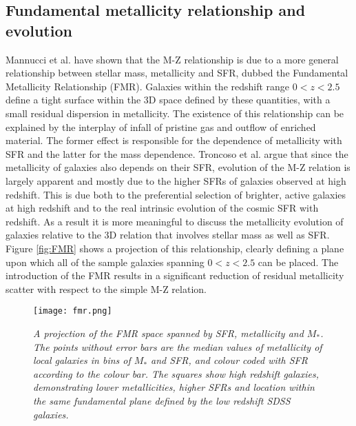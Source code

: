 \documentclass{literature}
\begin{document}
\subsection{Fundamental metallicity relationship and evolution}\label{subsec:fmr}
Mannucci et al. \citep{Mannucci2010} have shown that the M-Z relationship is due to a more general relationship between stellar mass, metallicity and SFR, dubbed the Fundamental Metallicity Relationship (FMR). Galaxies within the redshift range $0 < z < 2.5$ define a tight surface within the 3D space defined by these quantities, with a small residual dispersion in metallicity. The existence of this relationship can be explained by the interplay of infall of pristine gas and outflow of enriched material. The former effect is responsible for the dependence of metallicity with SFR and the latter for the mass dependence. Troncoso et al. \citep{Troncoso_2014} argue that since the metallicity of galaxies also depends on their SFR, evolution of the M-Z relation is largely apparent and mostly due to the higher SFRs of galaxies observed at high redshift. This is due both to the preferential selection of brighter, active galaxies at high redshift and to the real intrinsic evolution of the cosmic SFR with redshift. As a result it is more meaningful to discuss the metallicity evolution of galaxies relative to the 3D relation that involves stellar mass as well as SFR. Figure \ref{fig:FMR} shows a projection of this relationship, clearly defining a plane upon which all of the sample galaxies spanning $0 < z < 2.5$ can be placed. The introduction of the FMR results in a significant reduction of residual metallicity scatter with respect to the simple M-Z relation. \\ 

\begin{figure}[!htp]
\centering
\texttt{[image: fmr.png]}
\caption{\footnotesize{\emph{A projection of the FMR space spanned by SFR, metallicity and $M_{*}$. The points without error bars are the median values of metallicity of local galaxies in bins of $M_{*}$ and SFR, and colour coded with SFR according to the colour bar. The squares show high redshift galaxies, demonstrating lower metallicities, higher SFRs and location within the same fundamental plane defined by the low redshift SDSS galaxies.}}}
\label{fig:steidel_bpt}
\end{figure} 
\end{document}
